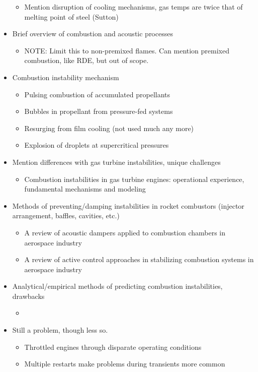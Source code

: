\begin{itemize}
\begin{itemize}
        \item Mention disruption of cooling mechanisms, gas temps are twice that of melting point of steel (Sutton)
    \end{itemize}
    \item Brief overview of combustion and acoustic processes
    \begin{itemize}
        \item NOTE: Limit this to non-premixed flames. Can mention premixed combustion, like RDE, but out of scope. 
    \end{itemize}
    \item Combustion instability mechanism
    \begin{itemize}
        \item Pulsing combustion of accumulated propellants
        \item Bubbles in propellant from pressure-fed systems
        \item Resurging from film cooling (not used much any more)
        \item Explosion of droplets at supercritical pressures
    \end{itemize}
    \item Mention differences with gas turbine instabilities, unique challenges
    \begin{itemize}
        \item Combustion instabilities in gas turbine engines: operational experience, fundamental mechanisms and modeling~\cite{Lieuwen2005}
    \end{itemize}
    \item Methods of preventing/damping instabilities in rocket combustors (injector arrangement, baffles, cavities, etc.)
    \begin{itemize}
        \item A review of acoustic dampers applied to combustion chambers in aerospace industry~\cite{Zhao2015}
        \item A review of active control approaches in stabilizing combustion systems in aerospace industry~\cite{Zhao2018}
    \end{itemize}
    \item Analytical/empirical methods of predicting combustion instabilities, drawbacks
    \begin{itemize}
        \item 
    \end{itemize}
    \item Still a problem, though less so. 
    \begin{itemize}
        \item Throttled engines through disparate operating conditions
        \item Multiple restarts make problems during transients more common
    \end{itemize}
\end{itemize}